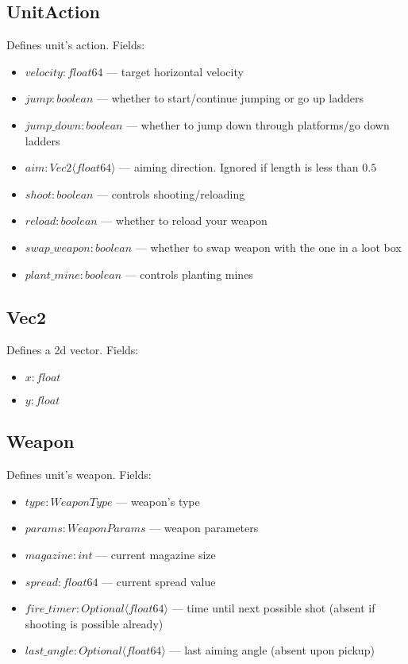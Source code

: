 \subsection{UnitAction}
Defines unit's action. Fields:
\begin{itemize}
    \item $velocity : float64$ --- target horizontal velocity
    \item $jump : boolean$ --- whether to start/continue jumping or go up ladders
    \item $jump\_down : boolean$ --- whether to jump down through platforms/go down ladders
    \item $aim : Vec2 \langle float64 \rangle$ --- aiming direction. Ignored if length is less than $0.5$
    \item $shoot : boolean$ --- controls shooting/reloading
    \item $reload : boolean$ --- whether to reload your weapon
    \item $swap\_weapon : boolean$ --- whether to swap weapon with the one in a loot box
    \item $plant\_mine : boolean$ --- controls planting mines
\end{itemize}

\subsection{Vec2}
Defines a 2d vector. Fields:
\begin{itemize}
    \item $x : float$
    \item $y : float$
\end{itemize}

\subsection{Weapon}
Defines unit's weapon. Fields:
\begin{itemize}
    \item $type : WeaponType$ --- weapon's type
    \item $params : WeaponParams$ --- weapon parameters
    \item $magazine : int$ --- current magazine size
    \item $spread : float64$ --- current spread value
    \item $fire\_timer : Optional \langle float64 \rangle$ --- time until next possible shot (absent if shooting is possible already)
    \item $last\_angle : Optional \langle float64 \rangle$ --- last aiming angle (absent upon pickup)
\end{itemize}

